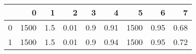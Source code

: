 \begin{tabular}{lrrrrrrrr}
\toprule
{} &     0 &    1 &     2 &    3 &     4 &     5 &     6 &     7 \\
\midrule
0 &  1500 &  1.5 &  0.01 &  0.9 &  0.91 &  1500 &  0.95 &  0.68 \\
1 &  1500 &  1.5 &  0.01 &  0.9 &  0.94 &  1500 &  0.95 &  0.72 \\
\bottomrule
\end{tabular}
